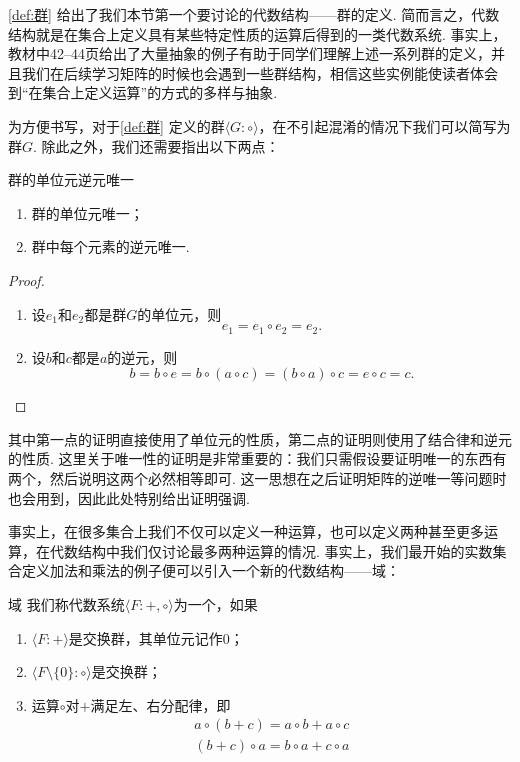 \autoref{def:群} 给出了我们本节第一个要讨论的代数结构——群的定义. 简而言之，代数结构就是在集合上定义具有某些特定性质的运算后得到的一类代数系统. 事实上，教材中42--44页给出了大量抽象的例子有助于同学们理解上述一系列群的定义，并且我们在后续学习矩阵的时候也会遇到一些群结构，相信这些实例能使读者体会到``在集合上定义运算''的方式的多样与抽象.

为方便书写，对于\autoref{def:群} 定义的群$\langle G\colon\circ\rangle$，在不引起混淆的情况下我们可以简写为群$G$. 除此之外，我们还需要指出以下两点：
\begin{theorem}{}{群的单位元逆元唯一}
    \begin{enumerate}
        \item 群的单位元唯一；

        \item 群中每个元素的逆元唯一.
    \end{enumerate}
\end{theorem}

\begin{proof}
    \begin{enumerate}
        \item 设$e_1$和$e_2$都是群$G$的单位元，则
              \[e_1=e_1\circ e_2=e_2.\]

        \item 设$b$和$c$都是$a$的逆元，则
              \[b=b\circ e=b\circ(a\circ c)=(b\circ a)\circ c=e\circ c=c.\]
    \end{enumerate}
\end{proof}

其中第一点的证明直接使用了单位元的性质，第二点的证明则使用了结合律和逆元的性质. 这里关于唯一性的证明是非常重要的：我们只需假设要证明唯一的东西有两个，然后说明这两个必然相等即可. 这一思想在之后证明矩阵的逆唯一等问题时也会用到，因此此处特别给出证明强调.

事实上，在很多集合上我们不仅可以定义一种运算，也可以定义两种甚至更多运算，在代数结构中我们仅讨论最多两种运算的情况. 事实上，我们最开始的实数集合定义加法和乘法的例子便可以引入一个新的代数结构——域：
\begin{definition}{域}{} 
    我们称代数系统$\langle F\colon+,\circ\rangle$为一个，如果
    \begin{enumerate}
        \item $\langle F\colon+\rangle$是交换群，其单位元记作0；

        \item $\langle F\setminus\{0\}\colon\circ\rangle$是交换群；

        \item 运算$\circ$对$+$满足左、右分配律，即
              \begin{gather*}
                  a\circ(b+c)=a\circ b+a\circ c \\
                  (b+c)\circ a=b\circ a+c\circ a
              \end{gather*}
    \end{enumerate}
\end{definition}

